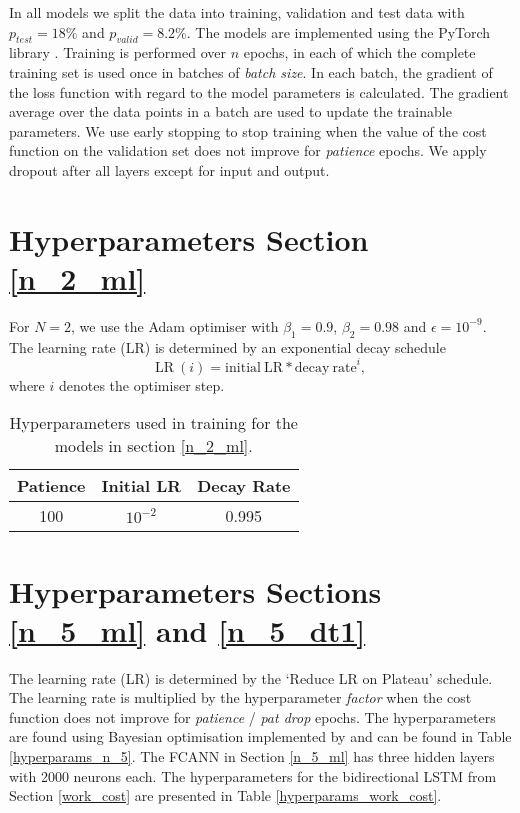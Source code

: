 In all models we split the data into training, validation and test data with $p_{test} = 18 \%$ and $p_{valid} = 8.2 \%$. 
The models are implemented using the PyTorch library \cite{NEURIPS2019_9015}. 
Training is performed over $n$ epochs, in each of which the complete training set is used once in batches of \textit{batch size}.
In each batch, the gradient of the loss function with regard to the model parameters is calculated.
The gradient average over the data points in a batch are used to update the trainable parameters.
We use early stopping to stop training when the value of the cost function on the validation set does not improve for \textit{patience} epochs.
We apply dropout \cite{hinton2012improving} after all layers except for input and output.

\section{Hyperparameters Section \ref{n_2_ml}}
For $N=2$, we use the Adam optimiser with $\beta_1 = 0.9$, $\beta_2 = 0.98$ and $\epsilon = 10^{-9}$. The learning rate (LR) is determined by an exponential decay schedule
\begin{equation} \label{eds}
\mathrm{LR} \ (i) = \mathrm{initial \ LR} * \mathrm{decay \ rate}^i,
\end{equation}
where $i$ denotes the optimiser step.


\begin{table}[h]
	\centering
	\begin{tabular}{c | c | c }
		Patience & Initial LR & Decay Rate \\
		\hline
		100 & $10^{-2}$ & 0.995 \\
	\end{tabular}
	\caption{Hyperparameters used in training for the models in section \ref{n_2_ml}.}
	\label{hyperparams_n_2}
\end{table}

\section{Hyperparameters Sections \ref{n_5_ml} and \ref{n_5_dt1}}
The learning rate (LR) is determined by the `Reduce LR on Plateau' schedule.
The learning rate is multiplied by the hyperparameter \textit{factor} when the cost function does not improve for \textit{patience} / \textit{pat drop} epochs.
The hyperparameters are found using Bayesian optimisation implemented by \cite{wandb} and can be found in Table \ref{hyperparams_n_5}.
The FCANN in Section \ref{n_5_ml} has three hidden layers with 2000 neurons each.
The hyperparameters for the bidirectional LSTM from Section \ref{work_cost} are presented in Table \ref{hyperparams_work_cost}.

